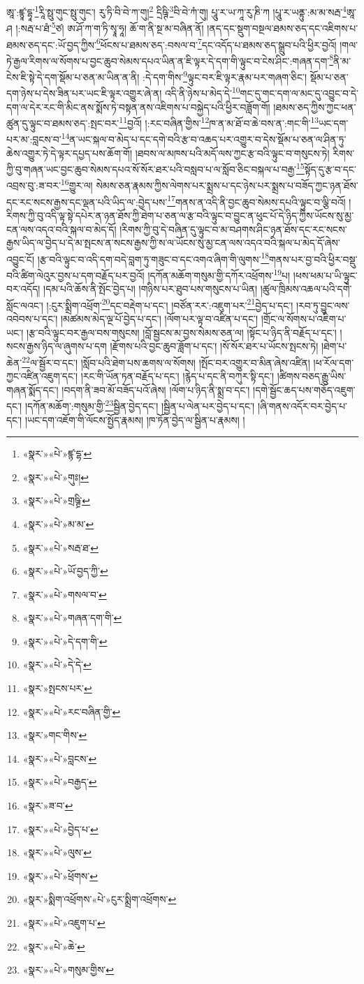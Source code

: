 ཨཱ་:ཛྙཱ་དྷཱ་\footnote{«སྣར་»«པེ་»ཛྙ་དྷ་}རཱི་སྥུ་གུང་སྥུ་གུང་། རུ་ཏི་བི་བེ་ཀ་གུ།\footnote{«སྣར་»«པེ་»གུཿ།} དྲིཥྚི་\footnote{«སྣར་»«པེ་»གྲཥྚྲི་}བི་བེ་ཀཾ་གུ། པཱུ་ར་ཡ་ཀཱ་རུ་ཎི་ཀ །པཱུ་ར་ཡནྟུ་:མ་མ་སརྦ་\footnote{«སྣར་»«པེ་»མ་མ་}ཨཱ་ཤ །:སརྦ་པ་ཐཾ་\footnote{«སྣར་»«པེ་»སརྦ་ཐ་}ཙ། ཨ་ཤོ་ཀ་ག་ཏི་སྭཱ་ཧཱ། ཆོ་ག་ནི་སྔ་མ་བཞིན་ནོ། །ནད་དང་སྡུག་བསྔལ་ཐམས་ཅད་དང་འཇིགས་པ་ཐམས་ཅད་དང་:ཡོ་བྱད་ཀྱིས་\footnote{«སྣར་»«པེ་»ཡོ་བྱད་ཀྱི་}ཕོངས་པ་ཐམས་ཅད་:བསལ་བ་\footnote{«སྣར་»«པེ་»གསལ་བ་}དང་འདོད་པ་ཐམས་ཅད་སྒྲུབ་པའི་ཕྱིར་བྱའོ། །གལ་ཏེ་རྒྱལ་རིགས་ལ་སོགས་པ་བྱང་ཆུབ་སེམས་དཔའ་ཡིན་ན་ཇི་ལྟར་དེ་དག་གི་ལྟུང་བ་ངེས་ཤིང་:གཞན་དག་\footnote{«སྣར་»«པེ་»གཞན་དག་གི་}ནི་མ་ངེས་ཇི་སྟེ་དེ་དག་སྡོམ་པ་ཅན་མ་ཡིན་ན་ནི། :དེ་དག་གིས་\footnote{«སྣར་»«པེ་»དེ་དག་གི་}ལྟུང་བར་ཇི་ལྟར་རྣམ་པར་གཞག་ཅིང་། སྡོམ་པ་ཅན་དག་ཉེས་པ་དེས་ཟིན་པར་ཡང་ཇི་ལྟར་འགྱུར་ཞེ་ན། འདི་ནི་ཉེས་པ་མེད་དེ་\footnote{«སྣར་»«པེ་»དེ་དེ་}གང་དུ་གང་དག་ལ་མང་དུ་འབྱུང་བ་དེ་དག་ལ་དེར་རང་གི་མིང་ནས་སྨོས་ཏེ་བསྟན་ནས་འཇིགས་པ་བསྐྱེད་པའི་ཕྱིར་བཟློག་གོ། །ཐམས་ཅད་ཀྱིས་ཀྱང་ཕན་ཚུན་དུ་ལྟུང་བ་ཐམས་ཅད་:སྤང་བར་\footnote{«སྣར་»སྤངས་པར་}བྱའོ། །:རང་བཞིན་གྱིས་\footnote{«སྣར་»«པེ་»རང་བཞིན་གྱི་}ཁ་ན་མ་ཐོ་བ་ཆེ་བས་ན་:གང་གི་\footnote{«སྣར་»གང་གིས་}ཡང་དག་པར་མ་:བླངས་བ་\footnote{«སྣར་»«པེ་»བླངས་}ན་ཡང་སྐལ་བ་མེད་པ་དང་དགེ་བའི་རྩ་བ་འཆད་པར་འགྱུར་བ་དེས་སྡོམ་པ་ཅན་ལ་ཤིན་ཏུ་ཆེས་འགྱུར་ཏེ་དེ་ལྟར་དཔྱད་པས་ཆོག་གོ། །ཐབས་ལ་མཁས་པའི་མདོ་ལས་ཀྱང་རྩ་བའི་ལྟུང་བ་གསུངས་ཏེ། རིགས་ཀྱི་བུ་གཞན་ཡང་བྱང་ཆུབ་སེམས་དཔའ་སོ་སོར་ཐར་པའི་བསླབ་པ་ལ་སློབ་ཅིང་བསྐལ་པ་བརྒྱ་\footnote{«སྣར་»«པེ་»བརྒྱད་}སྟོད་དུ་རྩ་བ་དང་འབྲས་བུ་:ཟ་བར་\footnote{«སྣར་»ཟ་བ་}གྱུར་ལ། སེམས་ཅན་རྣམས་ཀྱིས་ལེགས་པར་སྨྲས་པ་དང་ཉེས་པར་སྨྲས་པ་བཟོད་ཀྱང་ཉན་ཐོས་དང་རང་སངས་རྒྱས་དང་ལྡན་པའི་ཡིད་ལ་:བྱེད་པས་\footnote{«སྣར་»«པེ་»བྱེད་པ་}གནས་ན་འདི་ནི་བྱང་ཆུབ་སེམས་དཔའི་ལྟུང་བ་ལྕི་བའོ། །རིགས་ཀྱི་བུ་འདི་ལྟ་སྟེ་དཔེར་ན་ཉན་ཐོས་ཀྱི་ཐེག་པ་ཅན་ལ་རྩ་བའི་ལྟུང་བ་བྱུང་ན་ཕུང་པོ་དེ་ཉིད་ཀྱིས་ཡོངས་སུ་མྱ་ངན་ལས་འདའ་བའི་སྐལ་བ་མེད་དོ། །རིགས་ཀྱི་བུ་དེ་བཞིན་དུ་ལྟུང་བ་མ་བཤགས་ཤིང་ཉན་ཐོས་དང་རང་སངས་རྒྱས་ཡིད་ལ་བྱེད་པ་དེ་མ་སྤངས་ན་སངས་རྒྱས་ཀྱི་ས་ལ་ཡོངས་སུ་མྱ་ངན་ལས་འདའ་བའི་སྐལ་པ་མེད་དོ་ཞེས་འབྱུང་ངོ། །རྩ་བའི་ལྟུང་བ་འདི་དག་བདེ་བླག་ཏུ་གཟུང་བ་དང་འགའ་ཞིག་གི་ལུགས་\footnote{«སྣར་»«པེ་»ལུས་}གནས་པར་བྱ་བའི་ཕྱིར་བསྡུ་བའི་ཚིག་ལེའུར་བྱས་པ་དག་བརྗོད་པར་བྱའོ། །དཀོན་མཆོག་གསུམ་གྱི་དཀོར་འཕྲོགས་\footnote{«སྣར་»«པེ་»ཕྲོགས་}པ། །ཕས་ཕམ་པ་ཡི་ལྟུང་བར་འདོད། །དམ་པའི་ཆོས་ནི་སྤོང་བྱེད་པ། །གཉིས་པར་ཐུབ་པས་གསུངས་པ་ཡིན། །ཚུལ་ཁྲིམས་འཆལ་པའི་དགེ་སློང་ལའང་། །:ངུར་སྨྲིག་འཕྲོག་\footnote{«སྣར་»སྨིག་འཕྲོགས་«པེ་»ངུར་སྨྲིག་འཕྲོགས་}དང་བརྡེག་པ་དང་། །བཙོན་རར་:འཇུག་པར་\footnote{«སྣར་»«པེ་»འཇུག་པ་}བྱེད་པ་དང་། །རབ་ཏུ་བྱུང་ལས་འབེབས་པ་དང་། །མཚམས་མེད་ལྔ་པོ་བྱེད་པ་དང་། །ལོག་པར་ལྟ་བ་འཛིན་པ་དང་། །གྲོང་ལ་སོགས་པ་འཇིག་པ་ཡང་། །རྩ་བའི་ལྟུང་བར་རྒྱལ་བས་གསུངས། །བློ་སྦྱངས་མ་བྱས་སེམས་ཅན་ལ། །སྟོང་པ་ཉིད་ནི་བརྗོད་པ་དང་། །སངས་རྒྱས་ཉིད་ལ་ཞུགས་པ་དག །རྫོགས་པའི་བྱང་ཆུབ་ཟློག་པ་དང་། །སོ་སོར་ཐར་པ་ཡོངས་སྤངས་ཏེ། །ཐེག་པ་ཆེན་\footnote{«སྣར་»«པེ་»ཆེ་}ལ་སྦྱོར་བ་དང་། །སློབ་པའི་ཐེག་པས་ཆགས་ལ་སོགས། །སྤོང་བར་འགྱུར་བ་མིན་ཞེས་འཛིན། །ཕ་རོལ་དག་ཀྱང་འཛིན་འཇུག་དང་། །རང་གི་ཡོན་ཏན་བརྗོད་པ་དང་། །རྙེད་པ་དང་ནི་བཀུར་སྟི་དང་། །ཚིགས་བཅད་རྒྱུ་ཡིས་གཞན་སྨོད་དང་། །བདག་ནི་ཟབ་མོ་བཟོད་པའོ་ཞེས། །ལོག་པ་ཉིད་ནི་སྨྲ་བ་དང་། །དགེ་སྦྱོང་ཆད་པས་གཅོད་འཇུག་དང་། །དཀོན་མཆོག་:གསུམ་གྱི་\footnote{«སྣར་»«པེ་»གསུམ་གྱིས་}སྦྱིན་བྱེད་དང་། །སྦྱིན་པ་ལེན་པར་བྱེད་པ་དང་། །ཞི་གནས་འདོར་བར་བྱེད་པ་དང་། །ཡང་དག་འཇོག་གི་ལོངས་སྤྱོད་རྣམས། །ཁ་ཏོན་བྱེད་ལ་སྦྱིན་པ་རྣམས། །
